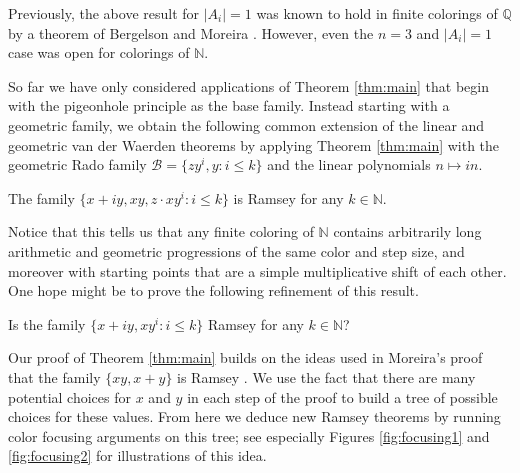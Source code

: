 \documentclass[tocmacros]{daj}
\begin{document}
Previously, the above result for $|A_i|=1$ was known to hold in finite colorings of $\mathbb{Q}$ by a theorem of Bergelson and Moreira \cite{bergelson2017ergodic}.  However, even the $n=3$ and $|A_i|=1$ case was open for colorings of $\mathbb{N}.$

So far we have only considered applications of Theorem \ref{thm:main} that begin with the pigeonhole principle as the base family.  Instead starting with a geometric family, we obtain the following common extension of the linear and geometric van der Waerden theorems by applying Theorem \ref{thm:main} with the geometric Rado family $\mathcal{B}=\{zy^i,y: i\leq k\}$ and the linear polynomials $n\mapsto in.$

\vspace{3mm}

\begin{corollary}
The family $\{x+iy,xy,z\cdot xy^i: i\leq k\}$ is Ramsey for any $k\in\mathbb{N}$.
\end{corollary}

Notice that this tells us that any finite coloring of $\mathbb{N}$ contains arbitrarily long arithmetic and geometric progressions of the same color and step size, and moreover with starting points that are a simple multiplicative shift of each other.  One hope might be to prove the following refinement of this result.

\vspace{3mm}

\begin{question}\label{double vdw}
Is the family $\{x+iy,xy^i: i\leq k\}$ Ramsey for any $k\in\mathbb{N}$? 
\end{question}

Our proof of Theorem \ref{thm:main} builds on the ideas used in Moreira's proof that the family $\{xy,x+y\}$ is Ramsey \cite{moreira2017monochromatic}.  We use the fact that there are many potential choices for $x$ and $y$ in each step of the proof to build a tree of possible choices for these values.  From here we deduce new Ramsey theorems by running color focusing arguments on this tree; see especially Figures \ref{fig:focusing1} and \ref{fig:focusing2} for illustrations of this idea.


\end{document}
